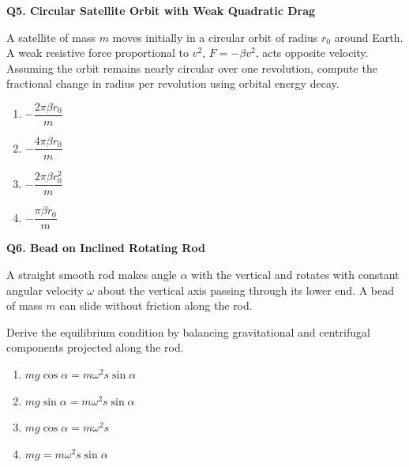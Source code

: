 \documentclass[12pt]{article}
\begin{document}
\textbf{Q5. Circular Satellite Orbit with Weak Quadratic Drag}

A satellite of mass $m$ moves initially in a circular orbit of radius $r_0$ around Earth. A weak resistive force proportional to $v^2$, $F = -\beta v^2$, acts opposite velocity. Assuming the orbit remains nearly circular over one revolution, compute the fractional change in radius per revolution using orbital energy decay.

\begin{enumerate}
\item[(A)] $-\dfrac{2\pi \beta r_0}{m}$
\item[(B)] $-\dfrac{4\pi \beta r_0}{m}$
\item[(C)] $-\dfrac{2\pi \beta r_0^2}{m}$
\item[(D)] $-\dfrac{\pi \beta r_0}{m}$
\end{enumerate}

\textbf{Q6. Bead on Inclined Rotating Rod}


A straight smooth rod makes angle $\alpha$ with the vertical and rotates with constant angular velocity $\omega$ about the vertical axis passing through its lower end. A bead of mass $m$ can slide without friction along the rod.

Derive the equilibrium condition by balancing gravitational and centrifugal components projected along the rod.

\begin{center}
\end{center}

\begin{enumerate}
\item[(A)] $mg\cos\alpha = m\omega^2 s\sin\alpha$
\item[(B)] $mg\sin\alpha = m\omega^2 s\sin\alpha$
\item[(C)] $mg\cos\alpha = m\omega^2 s$
\item[(D)] $mg = m\omega^2 s\sin\alpha$
\end{enumerate}
\end{document}
